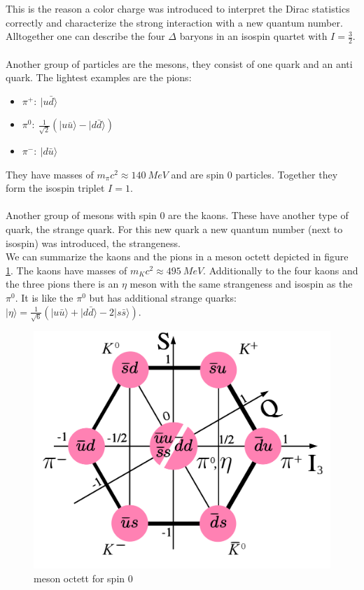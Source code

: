 \documentclass{include/thesisclass}
\newcommand{\rk}{\rangle}
\begin{document}
This is the reason a color charge was introduced to interpret the Dirac statistics correctly and characterize the strong interaction with a new quantum number.\\
Alltogether one can describe the four $\Delta$ baryons in an isospin quartet with $I = \frac{3}{2}$.\\
\\
Another group of particles are the mesons, they consist of one quark and an anti quark. The lightest examples are the pions:
\begin{itemize}
\item $\pi^+:~|u\bar{d}\rk$
\item $\pi^0:~\frac{1}{\sqrt{2}}\left( |u\bar{u}\rk - |d \bar{d}\rk\right)$
\item $\pi^-:~|d\bar{u}\rk$
\end{itemize}
They have masses of $m_\pi c^2 \approx 140~\si{MeV}$ and are spin $0$ particles. Together they form the isospin triplet $I = 1$.\\
\\
Another group of mesons with spin $0$ are the kaons. These have another type of quark, the strange quark. For this new quark a new quantum number (next to isospin) was introduced, the strangeness.\\
We can summarize the kaons and the pions in a meson octett depicted in figure \ref{1}. The kaons have masses of $m_Kc^2 \approx 495~\si{MeV}$. Additionally to the four kaons and the three pions there is an $\eta$ meson with the same strangeness and isospin as the $\pi^0$. It is like the $\pi^0$ but has additional strange quarks: $|\eta\rk = \frac{1}{\sqrt{6}}\left( |u\bar{u}\rk + |d\bar{d}\rk - 2 | s \bar{s}\rk\right)$.\\
\begin{figure}[H]
\centering
\includegraphics[scale=0.1]{include/mesonoctett.pdf}
\caption{meson octett for spin $0$}
\label{1}
\end{figure}
\end{document}
